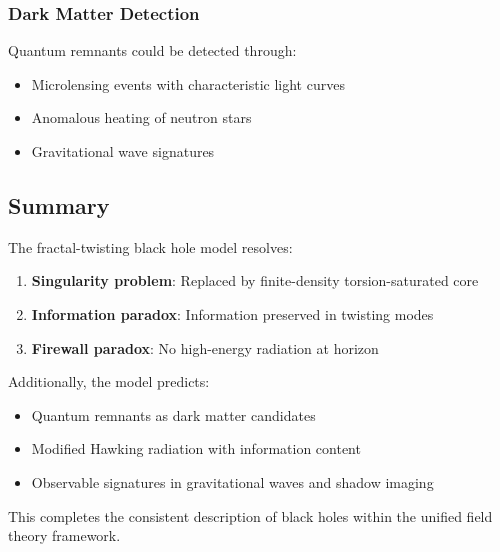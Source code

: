 \subsubsection{Dark Matter Detection}

Quantum remnants could be detected through:
\begin{itemize}
    \item Microlensing events with characteristic light curves
    \item Anomalous heating of neutron stars
    \item Gravitational wave signatures
\end{itemize}

\subsection{Summary}

The fractal-twisting black hole model resolves:
\begin{enumerate}
    \item \textbf{Singularity problem}: Replaced by finite-density torsion-saturated core
    \item \textbf{Information paradox}: Information preserved in twisting modes
    \item \textbf{Firewall paradox}: No high-energy radiation at horizon
\end{enumerate}

Additionally, the model predicts:
\begin{itemize}
    \item Quantum remnants as dark matter candidates
    \item Modified Hawking radiation with information content
    \item Observable signatures in gravitational waves and shadow imaging
\end{itemize}

This completes the consistent description of black holes within the unified field theory framework.
